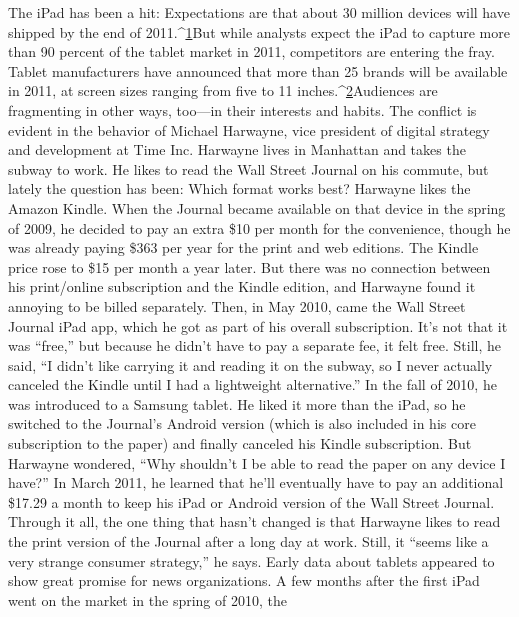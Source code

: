 The iPad has been a hit: Expectations are that about 30 million devices will
have shipped by the end of 2011.^{\href{#endnotes-chapter-4}{1}}But while analysts expect the iPad to capture
more than 90 percent of the tablet market in 2011, competitors are entering
the fray. Tablet manufacturers have announced that more than 25 brands will be
available in 2011, at screen sizes ranging from five to 11 inches.^{\href{#endnotes-chapter-4}{2}}Audiences are fragmenting in other ways, too—in their interests and habits.
The conflict is evident in the behavior of Michael Harwayne, vice president of
digital strategy and development at Time Inc. Harwayne lives in Manhattan and
takes the subway to work. He likes to read the Wall Street Journal on his commute,
but lately the question has been: Which format works best?
Harwayne likes the Amazon Kindle. When the Journal became available on
that device in the spring of 2009, he decided to pay an extra \$10 per month for
the convenience, though he was already paying \$363 per year for the print and
web editions. The Kindle price rose to \$15 per month a year later.
But there was no connection between his print/online subscription and the
Kindle edition, and Harwayne found it annoying to be billed separately. Then,
in May 2010, came the Wall Street Journal iPad app, which he got as part of
his overall subscription. It's not that it was ``free,'' but because he didn't have
to pay a separate fee, it felt free. Still, he said, ``I didn't like carrying it and
reading it on the subway, so I never actually canceled the Kindle until I had a
lightweight alternative.''
In the fall of 2010, he was introduced to a Samsung tablet. He liked it more
than the iPad, so he switched to the Journal's Android version (which is also
included in his core subscription to the paper) and finally canceled his Kindle
subscription. But Harwayne wondered, ``Why shouldn't I be able to read the
paper on any device I have?''
In March 2011, he learned that he'll eventually have to pay an additional
\$17.29 a month to keep his iPad or Android version of the Wall Street Journal.
Through it all, the one thing that hasn't changed is that Harwayne likes to read
the print version of the Journal after a long day at work. Still, it ``seems like a very
strange consumer strategy,'' he says.
Early data about tablets appeared to show great promise for news organizations.
A few months after the first iPad went on the market in the spring of 2010, the
